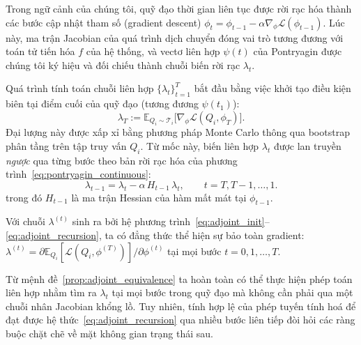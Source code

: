 Trong ngữ cảnh của chúng tôi, quỹ đạo thời gian liên tục được rời rạc hóa thành các bước cập nhật tham số (gradient descent) $\phi_{t} = \phi_{t-1} - \alpha \nabla_{\phi} \mathcal{L}(\phi_{t-1})$. Lúc này, ma trận Jacobian của quá trình dịch chuyển đóng vai trò tương đương với toán tử tiến hóa $f$ của hệ thống, và vectơ liên hợp $\psi(t)$ của Pontryagin được chúng tôi ký hiệu và đối chiếu thành chuỗi biến rời rạc $\lambda_t$.

Quá trình tính toán chuỗi liên hợp $\{\lambda_t\}_{t=1}^T$ bắt đầu bằng việc khởi tạo điều kiện biên tại điểm cuối của quỹ đạo (tương đương $\psi(t_1)$):
\begin{equation}
    \lambda_T := \mathbb{E}_{Q_i \sim \mathcal{T}_i}\big[\nabla_\phi \mathcal{L}(Q_i, \phi_T)\big].
    \label{eq:adjoint_init}
\end{equation}
Đại lượng này được xấp xỉ bằng phương pháp Monte Carlo thông qua bootstrap phân tầng trên tập truy vấn $Q_i$. Từ mốc này, biến liên hợp $\lambda_t$ được lan truyền \emph{ngược} qua từng bước theo bản rời rạc hóa của phương trình~\eqref{eq:pontryagin_continuous}:
\begin{equation}
    \lambda_{t-1} = \lambda_t - \alpha\, H_{t-1}\, \lambda_t, \qquad t = T, T-1, \dots, 1.
    \label{eq:adjoint_recursion}
\end{equation}
trong đó $H_{t-1}$ là ma trận Hessian của hàm mất mát tại $\phi_{t-1}$.

\begin{proposition}
\label{prop:adjoint_equivalence}
Với chuỗi $\lambda^{(t)}$ sinh ra bởi hệ phương trình~\eqref{eq:adjoint_init}--\eqref{eq:adjoint_recursion}, ta có đẳng thức thể hiện sự bảo toàn gradient: $\lambda^{(t)} = \partial \mathbb{E}_{Q_i}[\mathcal{L}(Q_i,\phi^{(T)})]/\partial \phi^{(t)}$ tại mọi bước $t = 0, 1, \dots, T$.
\end{proposition}

Từ mệnh đề~\ref{prop:adjoint_equivalence} ta hoàn toàn có thể thực hiện phép toán liên hợp nhằm tìm ra $\lambda_t$ tại mọi bước trong quỹ đạo mà không cần phải qua một chuỗi nhân Jacobian khổng lồ. Tuy nhiên, tính hợp lệ của phép tuyến tính hoá để đạt được hệ thức~\eqref{eq:adjoint_recursion} qua nhiều bước liên tiếp đòi hỏi các ràng buộc chặt chẽ về mặt không gian trạng thái sau.
 
